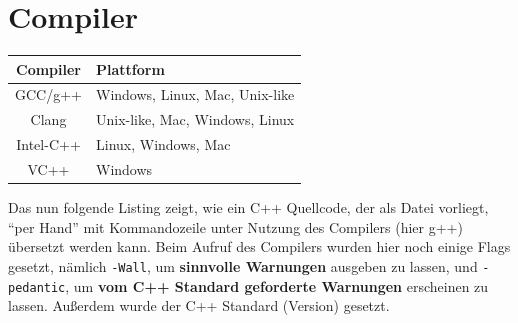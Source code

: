 \documentclass[a4paper]{report}
\begin{document}
\begin{center}
{
}
\end{center}


\section{Compiler}
\begin{center}
\begin{tabular}{|c|l|}
	\hline
	\textbf{Compiler} & \textbf{Plattform} \\ \hline \hline
	GCC/g++ & Windows, Linux, Mac, Unix-like \\ \hline
	Clang & Unix-like, Mac, Windows, Linux \\ \hline
	Intel-C++ & Linux, Windows, Mac \\ \hline
	VC++ & Windows \\ \hline
\end{tabular}
\end{center}
Das nun folgende Listing zeigt, wie ein C++ Quellcode, der als Datei vorliegt, "`per Hand"' mit Kommandozeile unter Nutzung des Compilers (hier g++) übersetzt werden kann. Beim Aufruf des Compilers wurden hier noch einige Flags gesetzt, nämlich \texttt{-Wall}, um \textbf{sinnvolle Warnungen} ausgeben zu lassen, und \texttt{-pedantic}, um \textbf{vom C++ Standard geforderte Warnungen} erscheinen zu lassen. Außerdem wurde der C++ Standard (Version) gesetzt.
\end{document}
